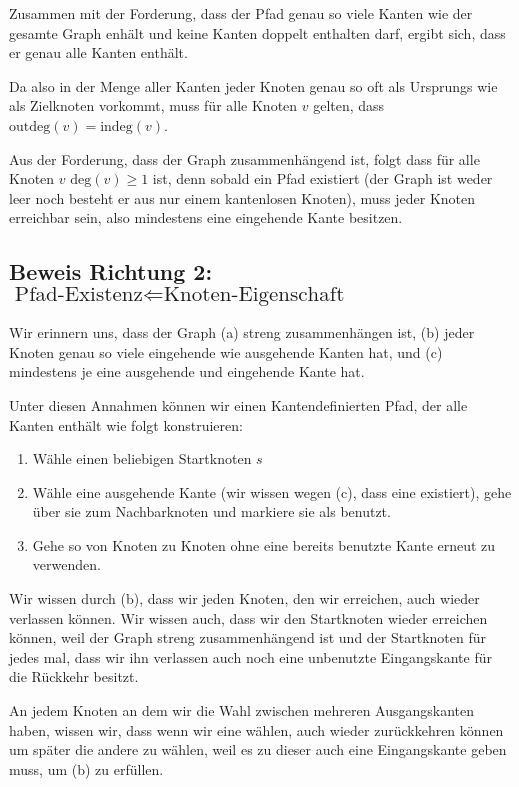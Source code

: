 \documentclass[parskip=half,a4paper]{scrartcl}
\begin{document}
Zusammen mit der Forderung, dass der Pfad genau so viele Kanten wie der gesamte Graph enhält und keine Kanten doppelt enthalten darf, ergibt sich, dass er genau alle Kanten enthält.

Da also in der Menge aller Kanten jeder Knoten genau so oft als Ursprungs wie als Zielknoten vorkommt, muss für alle Knoten $v$ gelten, dass $\text{outdeg}(v) = \text{indeg}(v)$.

Aus der Forderung, dass der Graph zusammenhängend ist, folgt dass für alle Knoten $v$ $\text{deg}(v) \ge 1$ ist, denn sobald ein Pfad existiert (der Graph ist weder leer noch besteht er aus nur einem kantenlosen Knoten), muss jeder Knoten erreichbar sein, also mindestens eine eingehende Kante besitzen.


\subsection*{Beweis Richtung 2: $\text{Pfad-Existenz} \Leftarrow \text{Knoten-Eigenschaft}$}

Wir erinnern uns, dass der Graph (a) streng zusammenhängen ist, (b) jeder Knoten genau so viele eingehende wie ausgehende Kanten hat, und (c) mindestens je eine ausgehende und eingehende Kante hat.

Unter diesen Annahmen können wir einen Kantendefinierten Pfad, der alle Kanten enthält wie folgt konstruieren:

\begin{enumerate}
    \item Wähle einen beliebigen Startknoten $s$
    \item Wähle eine ausgehende Kante (wir wissen wegen (c), dass eine existiert), gehe über sie zum Nachbarknoten und markiere sie als benutzt.
    \item Gehe so von Knoten zu Knoten ohne eine bereits benutzte Kante erneut zu verwenden.
\end{enumerate}

Wir wissen durch (b), dass wir jeden Knoten, den wir erreichen, auch wieder verlassen können. Wir wissen auch, dass wir den Startknoten wieder erreichen können, weil der Graph streng zusammenhängend ist und der Startknoten für jedes mal, dass wir ihn verlassen auch noch eine unbenutzte Eingangskante für die Rückkehr besitzt.

An jedem Knoten an dem wir die Wahl zwischen mehreren Ausgangskanten haben, wissen wir, dass wenn wir eine wählen, auch wieder zurückkehren können um später die andere zu wählen, weil es zu dieser auch eine Eingangskante geben muss, um (b) zu erfüllen.
\end{document}
